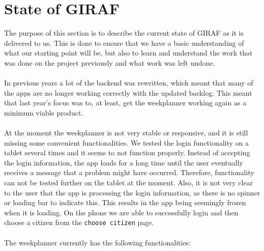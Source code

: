 \section{State of GIRAF}
The purpose of this section is to describe the current state of GIRAF as it is delivered to us.
This is done to ensure that we have a basic understanding of what our starting point will be, but also to learn and understand the work that was done on the project previously and what work was left undone.
\\\\
In previous years a lot of the backend was rewritten, which meant that many of the apps are no longer working correctly with the updated backlog.
This meant that last year's focus was to, at least, get the weekplanner working again as a minimum viable product.
\\\\
At the moment the weekplanner is not very stable or responsive, and it is still missing some convenient functionalities.
We tested the login functionality on a tablet several times and it seems to not function properly.
Instead of accepting the login information, the app loads for a long time until the user eventually receives a message that a problem might have occurred.
Therefore, functionality can not be tested further on the tablet at the moment.
Also, it is not very clear to the user that the app is processing the login information, as there is no spinner or loading bar to indicate this.
This results in the app being seemingly frozen when it is loading.
On the phone we are able to successfully login and then choose a citizen from the \texttt{choose citizen} page.
\\\\
The weekplanner currently has the following functionalities:
